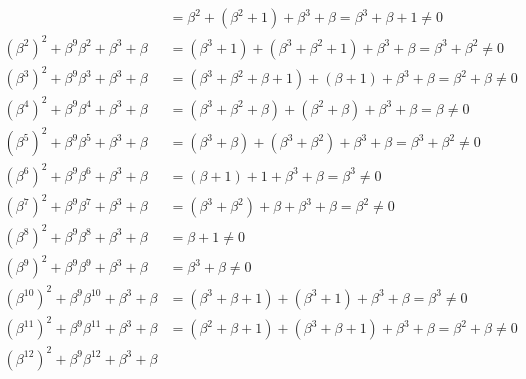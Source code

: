 \documentclass[11pt]{article}
\begin{document}
\begin{itemize}
\begin{align*}
                     &= \beta^2 + (\beta^2 + 1) + \beta^3 + \beta
                      = \beta^3 + \beta + 1
                      \neq 0\\
                        (\beta^2)^2 + \beta^9\beta^2 + \beta^3 + \beta
                     &= (\beta^3+1) + (\beta^3+\beta^2+1) + \beta^3 + \beta
                      =  \beta^3 + \beta^2
                      \neq 0\\
                        (\beta^3)^2 + \beta^9\beta^3 + \beta^3 + \beta
                     &= (\beta^3+\beta^2+\beta+1) + (\beta+1) + \beta^3 + \beta
                      =  \beta^2 + \beta
                      \neq 0\\
                        (\beta^4)^2 + \beta^9\beta^4 + \beta^3 + \beta
                     &= (\beta^3+\beta^2+\beta) + (\beta^2+\beta) + \beta^3 + \beta
                      =  \beta
                      \neq 0\\
                        (\beta^5)^2 + \beta^9\beta^5 + \beta^3 + \beta
                     &= (\beta^3+\beta) + (\beta^3+\beta^2) + \beta^3 + \beta
                      =  \beta^3 + \beta^2
                      \neq 0\\
                        (\beta^6)^2 + \beta^9\beta^6 + \beta^3 + \beta
                     &= (\beta+1) + 1 + \beta^3 + \beta
                      =  \beta^3
                      \neq 0\\
                        (\beta^7)^2 + \beta^9\beta^7 + \beta^3 + \beta
                     &= (\beta^3+\beta^2) + \beta + \beta^3 + \beta
                      = \beta^2
                      \neq 0\\
                        (\beta^8)^2 + \beta^9\beta^8 + \beta^3 + \beta
                     &= \beta + 1
                      \neq 0\\
                        (\beta^9)^2 + \beta^9\beta^9 + \beta^3 + \beta
                     &=  \beta^3 + \beta
                      \neq 0\\
                        (\beta^{10})^2 + \beta^9\beta^{10} + \beta^3 + \beta
                     &= (\beta^3+\beta+1) + (\beta^3+1) + \beta^3 + \beta
                      =  \beta^3
                      \neq 0\\
                        (\beta^{11})^2 + \beta^9\beta^{11} + \beta^3 + \beta
                     &= (\beta^2+\beta+1) + (\beta^3+\beta+1) + \beta^3 + \beta
                      =  \beta^2+\beta
                      \neq 0\\
                        (\beta^{12})^2 + \beta^9\beta^{12} + \beta^3 + \beta

\end{align*}
\end{itemize}
\end{document}
